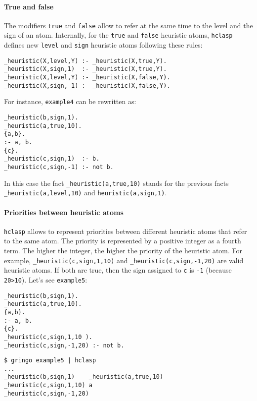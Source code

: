 \paragraph{True and false}

 The modifiers \texttt{true} and \texttt{false} allow to refer at the same time to the level and the sign of an atom. Internally,  for the \texttt{true} and \texttt{false} heuristic atoms, \texttt{hclasp} defines new \texttt{level} and \texttt{sign} heuristic atoms following these rules: 
\begin{verbatim}
_heuristic(X,level,Y) :- _heuristic(X,true,Y).
_heuristic(X,sign,1)  :- _heuristic(X,true,Y).
_heuristic(X,level,Y) :- _heuristic(X,false,Y).
_heuristic(X,sign,-1) :- _heuristic(X,false,Y).
\end{verbatim}

For instance, \texttt{example4} can be rewritten as: 
\begin{verbatim}
_heuristic(b,sign,1).
_heuristic(a,true,10).
{a,b}.
:- a, b.
{c}.
_heuristic(c,sign,1)  :- b.
_heuristic(c,sign,-1) :- not b.
\end{verbatim}

 In this case the fact \texttt{\_heuristic(a,true,10)} stands for the previous facts \texttt{\_heuristic(a,level,10)} and \texttt{heuristic(a,sign,1)}. 

\paragraph{Priorities between heuristic atoms}

\texttt{hclasp} allows to represent priorities between different heuristic atoms that refer to the same atom.  The priority is represented by a positive integer as a fourth term. The higher the integer, the higher the priority of the heuristic atom. For example, \texttt{\_heuristic(c,sign,1,10)} and \texttt{\_heuristic(c,sign,-1,20)} are valid heuristic atoms. If both are true, then the sign assigned to \texttt{c} is \texttt{-1} (because \texttt{20>10}).  Let's see \texttt{example5}: 
\begin{verbatim}
_heuristic(b,sign,1).
_heuristic(a,true,10).
{a,b}.
:- a, b.
{c}.
_heuristic(c,sign,1,10 ).
_heuristic(c,sign,-1,20) :- not b.
\end{verbatim}
\begin{verbatim}
$ gringo example5 | hclasp                                                                               
...
_heuristic(b,sign,1)    _heuristic(a,true,10) 
_heuristic(c,sign,1,10) a
_heuristic(c,sign,-1,20)\end{verbatim}


